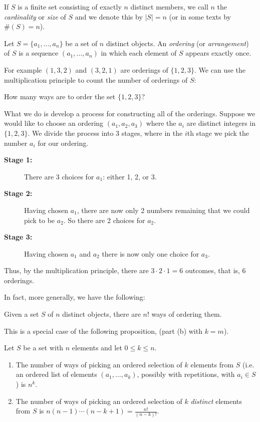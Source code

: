\documentclass[11pt,dvipsnames]{book}
\numberwithin{equation}{section} %
\numberwithin{figure}{section} %
\numberwithin{table}{section} %
\begin{document}
If $S$ is a finite set consisting of exactly $n$ distinct members, we call $n$ the {\em cardinality}
or {\em size} of $S$ and we denote this by $|S| = n$ (or in some texts by $\#(S) =n$).

\begin{definition}
Let $S = \{a_1, \dots , a_n\}$ be a set of $n$ distinct objects. An {\it ordering} (or {\it arrangement}) of $S$ is a sequence $(a_{1}, \dots ,a_{n})$ in which each element of $S$ appears exactly once. 
\end{definition}

For example $(1,3,2)$ and $(3,2,1)$ are orderings of $\{1,2,3\}$. We can use the multiplication principle to count the number of orderings of $S$:

\begin{example}
How many ways are to order the set $\{1,2,3\}$?

What we do is develop a process for constructing all of the orderings. Suppose we would like to choose an ordering $(a_{1},a_{2},a_{3})$ where the $a_{i}$ are distinct integers in $\{1, 2, 3\}$. We divide the process into 3 stages, where in the $i$th stage we pick the number $a_{i}$ for our ordering. 
\begin{description}
\item[\bf Stage 1:] There are $3$ choices for $a_{1}$: either 1, 2, or 3.
\item[\bf Stage 2:] Having chosen $a_{1}$, there are now only 2 numbers remaining that we could pick to be $a_{2}$. So there are 2 choices for $a_2$. 
\item[\bf Stage 3:] Having chosen $a_{1}$ and $a_{2}$ there is now only one choice for $a_{3}$. 
\end{description} 
\medskip
Thus, by the multiplication principle, there are $3\cdot 2\cdot 1 = 6$ outcomes, that is, $6$ orderings.
\end{example}

In fact, more generally, we have the following:



\begin{theorem}
Given a set $S$ of $n$ distinct objects, there are $n!$ ways of ordering them.
\end{theorem}

This is a special case of the following proposition, (part (b) with $k=m$).

\begin{proposition}
\label{p:n^k}
Let $S$ be a set with $n$ elements and let $0\leq k\leq n$. 
\begin{enumerate}[label=(\alph*)]
\item The number of ways of picking an ordered selection of $k$ elements from $S$ (i.e. an ordered list of elements $(a_{1}, \dots ,a_{k})$, possibly with repetitions, with $a_i\in S$) is $n^{k}$. 
\item The number of ways of picking an ordered selection of $k$ {\it distinct} elements from $S$ is $n(n-1)\cdots (n-k+1) = \frac{n!}{(n-k)!}$.
\end{enumerate}
\end{proposition}
\end{document}
